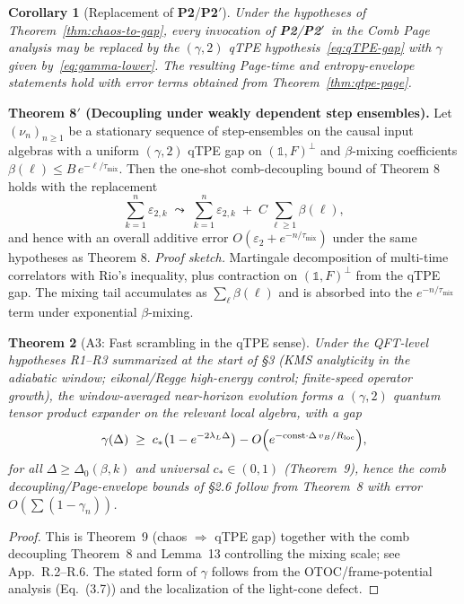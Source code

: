 \documentclass[aps,prd,preprint,onecolumn,superscriptaddress,nofootinbib,longbibliography,floatfix,11pt,showpacs,showkeys]{revtex4-2}
\newcommand{\Ptwo}{\textbf{P2}\xspace}
\newcommand{\PtwoPrime}{\textbf{P2$'$}\xspace}
\theoremstyle{plain}
\newtheorem{theorem}{Theorem}
\newtheorem{corollary}[theorem]{Corollary}
\theoremstyle{definition}
\theoremstyle{remark}
\begin{document}
\begin{corollary}[Replacement of \Ptwo/\PtwoPrime]\label{cor:replace-P2}
Under the hypotheses of Theorem~\ref{thm:chaos-to-gap}, every invocation of \Ptwo/\PtwoPrime\ in the Comb Page analysis may be replaced by the $(\gamma,2)$ qTPE hypothesis~\eqref{eq:qTPE-gap} with $\gamma$ given by~\eqref{eq:gamma-lower}. The resulting Page-time and entropy-envelope statements hold with error terms obtained from Theorem~\ref{thm:qtpe-page}.
\end{corollary}

% 
\medskip\noindent\textbf{Theorem 8$'$ (Decoupling under weakly dependent step ensembles).}
Let \((\nu_n)_{n\ge 1}\) be a stationary sequence of step-ensembles on the causal input algebras with a uniform \((\gamma,2)\) qTPE gap on \((\mathbb{1},F)^\perp\) and \(\beta\)-mixing coefficients \(\beta(\ell)\le B\,e^{-\ell/\tau_{\mathrm{mix}}}\). Then the one-shot comb-decoupling bound of Theorem 8 holds with the replacement
\[
  \sum_{k=1}^n \varepsilon_{2,k} \;\leadsto\; \sum_{k=1}^n \varepsilon_{2,k} \;+\; C\,\!\sum_{\ell\ge 1}\beta(\ell),
\]
and hence with an overall additive error \(O(\varepsilon_2 + e^{-n/\tau_{\mathrm{mix}}})\) under the same hypotheses as Theorem 8. 
\emph{Proof sketch.} Martingale decomposition of multi-time correlators with Rio's inequality, plus contraction on \((\mathbb{1},F)^\perp\) from the qTPE gap. The mixing tail accumulates as \(\sum_\ell \beta(\ell)\) and is absorbed into the \(e^{-n/\tau_{\mathrm{mix}}}\) term under exponential \(\beta\)-mixing.

\begin{theorem}[A3: Fast scrambling in the qTPE sense]\label{thm:A3-qTPE}\label{def:scrambling-quantified}
Under the QFT-level hypotheses R1--R3 summarized at the start of \S3 (KMS analyticity in the adiabatic window; eikonal/Regge high-energy control; finite-speed operator growth), the window-averaged near-horizon evolution forms a $(\gamma,2)$ quantum tensor product expander on the relevant local algebra, with a gap
\[
\gamma(\Delta) \;\ge\; c_*\!\left(1-e^{-2\lambda_L \Delta}\right) - O\!\left(e^{-\mathrm{const}\cdot \Delta\, v_B/R_{\rm loc}}\right)\!,
\]
for all $\Delta\ge \Delta_0(\beta,k)$ and universal $c_*\in(0,1)$ (Theorem~9), hence the comb decoupling/Page-envelope bounds of \S2.6 follow from Theorem~8 with error $O(\sum (1-\gamma_n))$.
\end{theorem}

\begin{proof}
This is Theorem~9 (chaos $\Rightarrow$ qTPE gap) together with the comb decoupling Theorem~8 and Lemma~13 controlling the mixing scale; see App.~R.2--R.6. The stated form of $\gamma$ follows from the OTOC/frame-potential analysis (Eq.~(3.7)) and the localization of the light-cone defect. 
\end{proof}
\end{document}
